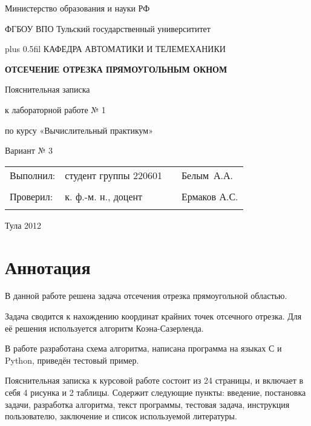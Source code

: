 \documentclass[a4paper,12pt,russian]{article}
\makeatletter
\renewcommand{\normalfont}{\fontsize{14}{20}\fontfamily{ftm}\linespread{1.25}\selectfont}
\renewcommand{\tiny}{\fontsize{12}{14}\fontfamily{ftm}\linespread{1.0}\selectfont}
\renewcommand{\maketitle}[2]{
\begin{titlepage}
\begin{center}\linespread{1}\parskip=0.0cm\normalfont
Министерство образования и науки РФ

ФГБОУ ВПО Тульский государственный университитет

\vskip 0pt plus 0.5fil
КАФЕДРА АВТОМАТИКИ И ТЕЛЕМЕХАНИКИ

\vfill
\textbf{#1}

\vskip 2cm
Пояснительная записка 

к лабораторной работе № #2


по курсу «Вычислительный практикум»

\vfill
Вариант № 3

\vfill
\begin{tabular*}{\textwidth}{ll@{\extracolsep{\fill}}c@{\extracolsep{0pt}}l}
Выполнил: & студент группы 220601&&Белым~А.А.\\ \cline{3-3}
								&&\tiny{(подпись)}& 	\\
Проверил: & к. ф.-м. н., доцент &&Ермаков А.С.\\ \cline{3-3}
								&&\tiny{(подпись)}& 	\\
\end{tabular*}
\vfill
Тула 2012
\end{center}
\end{titlepage}
}
\newcommand{\ssec}[1]{\section{#1}\hspace*{\parindent}}
\makeatother
\begin{document}
\maketitle {ОТСЕЧЕНИЕ ОТРЕЗКА ПРЯМОУГОЛЬНЫМ ОКНОМ}{1}
\ssec{Аннотация}
\normalfont
В данной работе решена задача отсечения отрезка прямоугольной областью.

Задача сводится к нахождению координат крайних точек отсечного отрезка. Для её решения используется алгоритм Коэна-Сазерленда.

В работе разработана схема алгоритма, написана программа на языках С и Python, приведён тестовый пример.

Пояснительная записка к курсовой работе состоит из 24 страницы, и включает в себя 4 рисунка и 2 таблицы. Содержит следующие пункты: введение, постановка задачи, разработка алгоритма, текст программы, тестовая задача, инструкция пользователю, заключение и список используемой литературы.
\end{document}
